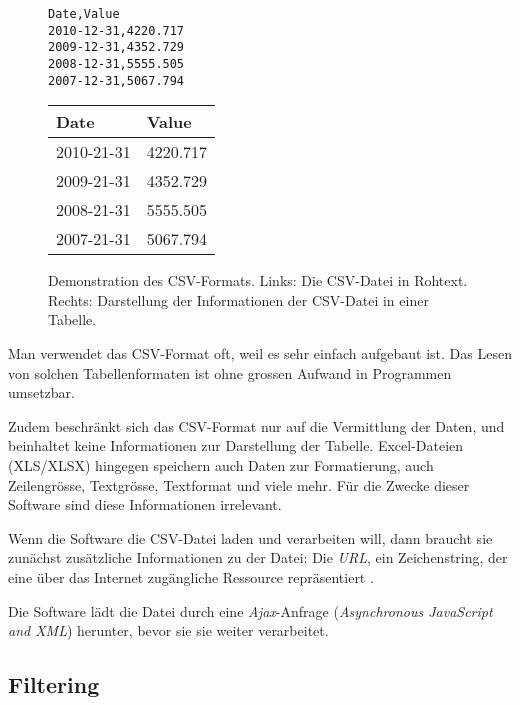 \begin{figure}[!htbp]
	\centering
	\begin{minipage}{0.5\textwidth}
		\centering
		\begin{verbatim}
Date,Value
2010-12-31,4220.717
2009-12-31,4352.729
2008-12-31,5555.505
2007-12-31,5067.794
		\end{verbatim}
	\end{minipage}\hfill
	\begin{minipage}{0.5\textwidth}
		\centering
		\begin{tabular}{ | l | l |}
			\hline
			\textbf{Date} & \textbf{Value} \\ \hline
			2010-21-31 & 4220.717 \\ \hline
			2009-21-31 & 4352.729 \\ \hline
			2008-21-31 & 5555.505 \\ \hline
			2007-21-31 & 5067.794 \\ \hline
		\end{tabular}
	\end{minipage}
	\caption[Demonstration des CSV-Formats]{Demonstration des CSV-Formats. Links: Die CSV-Datei in Rohtext. Rechts: Darstellung der Informationen der CSV-Datei in einer Tabelle.}
	\label{fig:csv}
\end{figure}

Man verwendet das CSV-Format oft, weil es sehr einfach aufgebaut ist. Das Lesen von solchen Tabellenformaten ist ohne grossen Aufwand in Programmen umsetzbar. 

 Zudem beschränkt sich das CSV-Format nur auf die Vermittlung der Daten, und beinhaltet keine Informationen zur Darstellung der Tabelle. Excel-Dateien (XLS/XLSX) hingegen speichern auch Daten zur Formatierung, auch Zeilengrösse, Textgrösse, Textformat und viele mehr. Für die Zwecke dieser Software sind diese Informationen irrelevant.
 
 
Wenn die Software die CSV-Datei laden und verarbeiten will, dann braucht sie zunächst zusätzliche Informationen zu der Datei: Die \textit{URL}, ein Zeichenstring, der eine über das Internet zugängliche Ressource repräsentiert \cite{url}.

Die Software lädt die Datei durch eine \textit{Ajax}-Anfrage (\textit{Asynchronous JavaScript and XML}) herunter, bevor sie sie weiter verarbeitet.

\subsection{Filtering}

